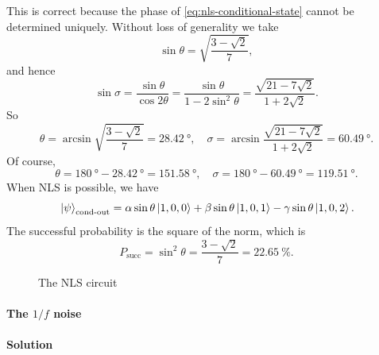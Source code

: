 \documentclass[hyperref, a4paper]{article}
\begin{document}
\begin{itemize}
    This is correct because the phase of \eqref{eq:nls-conditional-state} cannot be determined uniquely.
    Without loss of generality we take 
    \[
        \sin \theta = \sqrt{\frac{3 - \sqrt{2}}{7}},
    \]
    and hence 
    \[
        \sin \sigma = \frac{\sin \theta}{\cos 2 \theta} = \frac{\sin \theta}{1 - 2 \sin^2 \theta} = \frac{\sqrt{21 - 7 \sqrt{2}}}{1 + 2 \sqrt{2}}.
    \]
    So 
    \begin{equation}
        \theta = \arcsin \sqrt{\frac{3 - \sqrt{2}}{7}} = \SI{28.42}{\degree}, \quad \sigma = \arcsin \frac{\sqrt{21 - 7 \sqrt{2}}}{1 + 2 \sqrt{2}} = \SI{60.49}{\degree}.
    \end{equation}
    Of course, 
    \begin{equation}
        \theta = \SI{180}{\degree} - \SI{28.42}{\degree} = \SI{151.58}{\degree}, \quad \sigma = \SI{180}{\degree} - \SI{60.49}{\degree} = \SI{119.51}{\degree}.
    \end{equation}
    When NLS is possible, we have 
    \[
        \ket*{\psi}_\text{cond-out} = \alpha \sin \theta \ket*{1, 0, 0} + \beta \sin \theta \ket*{1, 0, 1} - \gamma \sin \theta \ket*{1, 0, 2}.
    \]
    The successful probability is the square of the norm, which is 
    \begin{equation}
        P_\text{succ} = \sin^2 \theta = \frac{3 - \sqrt{2}}{7} = \SI{22.65}{\percent}.
    \end{equation}
\end{itemize}

\begin{figure}
    \centering
    
    \caption{The NLS circuit}
    \label{fig:nls}
\end{figure}

\paragraph{}

\paragraph{The $1/f$ noise} 

\paragraph{Solution}

\paragraph{} 
\end{document}
